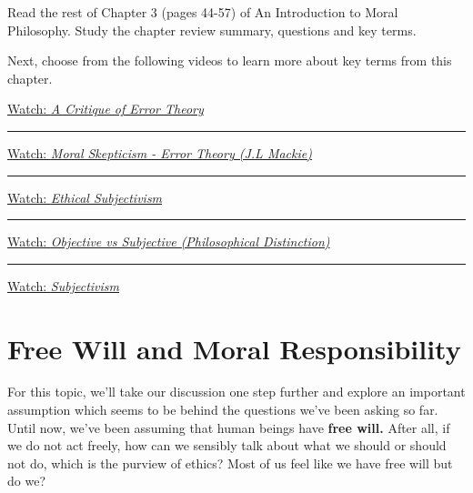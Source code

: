 \documentclass[
]{book}
\begin{document}
\begin{reflect}
Read the rest of Chapter 3 (pages 44-57) of An Introduction to Moral Philosophy. Study the chapter review summary, questions and key terms.

Next, choose from the following videos to learn more about key terms from this chapter.

\href{https://www.youtube.com/watch?v=WkVR99xX5XI}{Watch: \emph{A Critique of Error Theory}}

\begin{center}\rule{0.5\linewidth}{0.5pt}\end{center}

\href{https://www.youtube.com/watch?v=ycfRRJAkJLA}{Watch: \emph{Moral Skepticism - Error Theory (J.L Mackie)}}

\begin{center}\rule{0.5\linewidth}{0.5pt}\end{center}

\href{https://www.youtube.com/watch?v=7E3_kVg4sbY}{Watch: \emph{Ethical Subjectivism}}

\begin{center}\rule{0.5\linewidth}{0.5pt}\end{center}

\href{https://www.youtube.com/watch?v=jlutlCrVQN4}{Watch: \emph{Objective vs Subjective (Philosophical Distinction)}}

\begin{center}\rule{0.5\linewidth}{0.5pt}\end{center}

\href{https://www.youtube.com/watch?v=UMUy9WX6sRQ}{Watch: \emph{Subjectivism}}
\end{reflect}

\hypertarget{free-will-and-moral-responsibility}{%
\section{Free Will and Moral Responsibility}\label{free-will-and-moral-responsibility}}

For this topic, we'll take our discussion one step further and explore an important assumption which seems to be behind the questions we've been asking so far. Until now, we've been assuming that human beings have \textbf{free will.} After all, if we do not act freely, how can we sensibly talk about what we should or should not do, which is the purview of ethics? Most of us feel like we have free will but do we?
\end{document}
